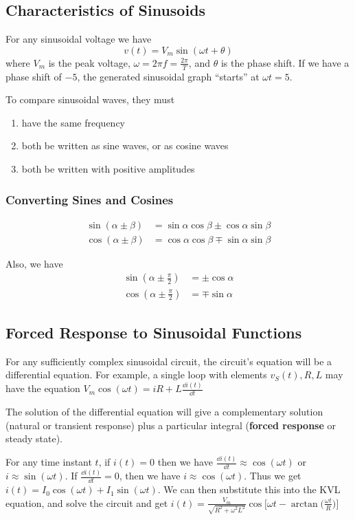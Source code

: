 \documentclass[12pt]{article}
\begin{document}
\subsection*{Characteristics of Sinusoids}
For any sinusoidal voltage we have \[ v(t) = V_m \sin(\omega t + \theta) \] where $V_m$ is the peak voltage, $\omega = 2\pi f = \frac{2\pi}{T}$, and $\theta$ is the phase shift. If we have a phase shift of $-5$, the generated sinusoidal graph ``starts'' at $\omega t = 5$.

To compare sinusoidal waves, they must
\begin{enumerate}
\item have the same frequency
\item both be written as sine waves, or as cosine waves
\item both be written with positive amplitudes
\end{enumerate}

\subsubsection*{Converting Sines and Cosines}
\begin{align*}
\sin(\alpha \pm \beta) &= \sin\alpha\cos\beta \pm \cos\alpha\sin\beta\\
\cos(\alpha \pm \beta) &= \cos\alpha\cos\beta \mp \sin\alpha\sin\beta
\end{align*}

Also, we have
\begin{align*}
\sin(\alpha \pm \frac{\pi}{2}) &= \pm\cos\alpha\\
\cos(\alpha \pm \frac{\pi}{2}) &= \mp\sin\alpha
\end{align*}

\subsection*{Forced Response to Sinusoidal Functions}
For any sufficiently complex sinusoidal circuit, the circuit's equation will be a differential equation. For example, a single loop with elements $v_S(t), R, L$ may have the equation $V_m \cos(\omega t) = iR + L\frac{\dd i(t)}{\dd t}$

The solution of the differential equation will give a complementary solution (natural or transient response) plus a particular integral ({\bf forced response} or steady state).

For any time instant $t$, if $i(t) = 0$ then we have $\frac{\dd i(t)}{\dd t} \approx \cos(\omega t)$ or $i \approx \sin(\omega t)$. If $\frac{\dd i(t)}{\dd t} = 0$, then we have $i \approx \cos(\omega t)$. Thus we get $i(t) = I_0\cos(\omega t) + I_1\sin(\omega t)$. We can then substitute this into the KVL equation, and solve the circuit and get $i(t) = \frac{V_m}{\sqrt{R^2 + \omega^2L^2}}\cos\bigg[\omega t - \arctan\bigl(\frac{\omega t}{R}\bigl)\bigg]$
\end{document}
